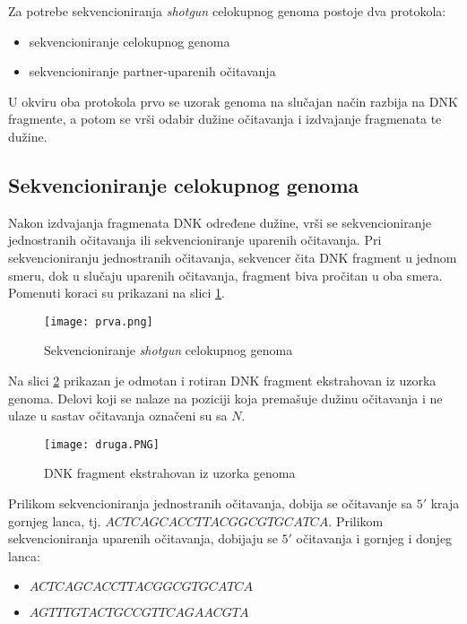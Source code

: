 \documentclass[12pt,oneside]{memoir}
\begin{document}
Za potrebe sekvencioniranja \textit{shotgun} celokupnog genoma postoje dva protokola:
\begin{itemize}
\itemsep0em 
    \item {sekvencioniranje celokupnog genoma}
    \item {sekvencioniranje partner-uparenih očitavanja}
\end{itemize}

\noindent U okviru oba protokola prvo se uzorak genoma na slučajan način razbija na DNK fragmente, a potom se vrši odabir dužine očitavanja i izdvajanje fragmenata te dužine.

\subsection{Sekvencioniranje celokupnog genoma}

Nakon izdvajanja fragmenata DNK određene dužine, vrši se sekvencioniranje jednostranih očitavanja ili sekvencioniranje uparenih očitavanja. Pri sekvencioniranju jednostranih očitavanja, sekvencer čita DNK fragment u jednom smeru, dok u slučaju uparenih očitavanja, fragment biva pročitan u oba smera. Pomenuti koraci su prikazani na slici \ref{fig:1}.

\begin{figure}[!ht]
  \centering
  \texttt{[image: prva.png]}
  \caption{Sekvencioniranje \textit{shotgun} celokupnog genoma \cite{WingKinSung}}
\label{fig:1}
\end{figure}

Na slici \ref{fig:2} prikazan je odmotan i rotiran DNK fragment ekstrahovan iz uzorka genoma. Delovi koji se nalaze na poziciji koja premašuje dužinu očitavanja i ne ulaze u sastav očitavanja označeni su sa $N$. 

\begin{figure}[!ht]
  \centering
  \texttt{[image: druga.PNG]}
  \caption{DNK fragment ekstrahovan iz uzorka genoma \cite{WingKinSung}}
  \label{fig:2}
\end{figure}

 Prilikom sekvencioniranja jednostranih očitavanja, dobija se očitavanje sa $5'$ kraja gornjeg lanca, tj. $ACTCAGCACCTTACGGCGTGCATCA$. Prilikom sekvencioniranja uparenih očitavanja, dobijaju se $5'$ očitavanja i gornjeg i donjeg lanca:

\begin{itemize}
\itemsep0em 
    \item {$ACTCAGCACCTTACGGCGTGCATCA$}
    \item {$AGTTTGTACTGCCGTTCAGAACGTA$}
\end{itemize}
\end{document}
